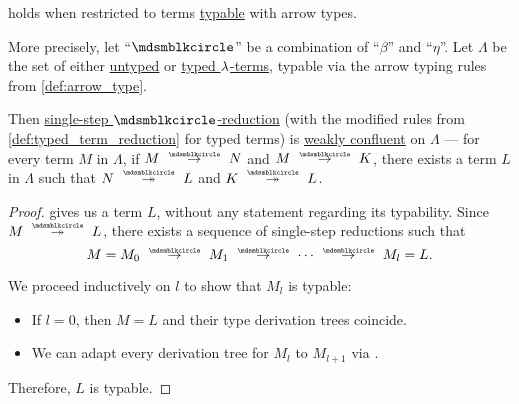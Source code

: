 \begin{proposition}\label{thm:simply_typed_church_rosser_theorem}
   holds when restricted to terms \hyperref[def:typability]{typable} with arrow types.

  More precisely, let \enquote{\( {\Anon} \)} be a combination of \enquote{\( \beta \)} and \enquote{\( \eta \)}. Let \( \Lambda \) be the set of either \hyperref[def:lambda_term]{untyped} or \hyperref[def:typed_lambda_term]{typed \( {\mathrm \lambda} \)-terms}, typable via the arrow typing rules from \cref{def:arrow_type}.

  Then \hyperref[def:lambda_term_reduction/single]{single-step \( \Anon \)-reduction} (with the modified rules from \cref{def:typed_term_reduction} for typed terms) is \hyperref[def:reduction_confluence]{weakly confluent} on \( \Lambda \) --- for every term \( M \) in \( \Lambda \), if \( M \pred N \) and \( M \pred K \), there exists a term \( L \) in \( \Lambda \) such that \( N \pred* L \) and \( K \pred* L \).
\end{proposition}
\begin{proof}
   gives us a term \( L \), without any statement regarding its typability. Since \( M \pred* L \), there exists a sequence of single-step reductions such that
  \begin{equation*}
    M = M_0 \pred M_1 \pred \cdots \pred M_l = L.
  \end{equation*}

  We proceed inductively on \( l \) to show that \( M_l \) is typable:
  \begin{itemize}
    \item If \( l = 0 \), then \( M = L \) and their type derivation trees coincide.
    \item We can adapt every derivation tree for \( M_l \) to \( M_{l+1} \) via .
  \end{itemize}

  Therefore, \( L \) is typable.
\end{proof}
